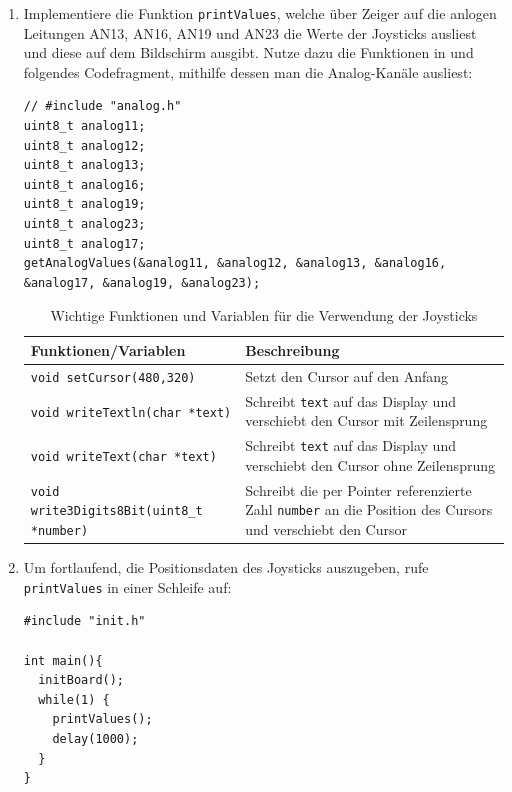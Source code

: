 \begin{enumerate}
\item
Implementiere die Funktion \lstinline|printValues|, welche über Zeiger auf die anlogen Leitungen AN13, AN16, AN19 und AN23 die Werte der Joysticks ausliest und diese auf dem Bildschirm ausgibt.  
Nutze dazu die Funktionen in  und folgendes Codefragment, mithilfe dessen man die Analog-Kanäle ausliest:
\begin{lstlisting}
// #include "analog.h"
uint8_t analog11;
uint8_t analog12;
uint8_t analog13;
uint8_t analog16;
uint8_t analog19;
uint8_t analog23;
uint8_t analog17;
getAnalogValues(&analog11, &analog12, &analog13, &analog16, &analog17, &analog19, &analog23);
\end{lstlisting}
%
\begin{table}[]
    \centering
    \caption{Wichtige Funktionen und Variablen für die Verwendung der Joysticks}
    \label{tab:joystickInfo}
    \begin{tabular}{p{7cm}p{7cm}}
        \toprule
        \textbf{Funktionen/Variablen} & \textbf{Beschreibung} \\
        \midrule
        \lstinline|void setCursor(480,320)| & Setzt den Cursor auf den Anfang \\
        \lstinline|void writeTextln(char *text)| & Schreibt \lstinline|text| auf das Display und verschiebt den Cursor mit Zeilensprung \\
        \lstinline|void writeText(char *text)| & Schreibt \lstinline|text| auf das Display und verschiebt den Cursor ohne Zeilensprung \\
        \lstinline|void write3Digits8Bit(uint8_t *number)| & Schreibt die per Pointer referenzierte Zahl \lstinline|number| an die Position des Cursors und verschiebt den Cursor\\
        \bottomrule
    \end{tabular}
\end{table}

\item 
Um fortlaufend, die Positionsdaten des Joysticks auszugeben, rufe \lstinline|printValues| in einer Schleife auf:
\begin{minipage}{\textwidth}
\begin{lstlisting}[]
#include "init.h"

int main(){
  initBoard();
  while(1) {
    printValues();
    delay(1000);
  }
}
\end{lstlisting}\end{minipage} 
\end{enumerate}





